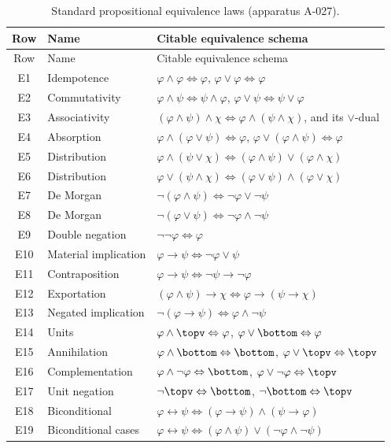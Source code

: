 \begingroup\small
\begin{longtable}{@{}clp{}@{}}
\caption{Standard propositional equivalence laws (apparatus A-027).}
\label{tab:p02-equivalence-laws}\\
\toprule Row & Name & Citable equivalence schema \\
\midrule\endfirsthead
\toprule Row & Name & Citable equivalence schema \\
\midrule\endhead
E1 & Idempotence & \(\varphi\land\varphi\Leftrightarrow\varphi\),
 \(\varphi\lor\varphi\Leftrightarrow\varphi\) \\
E2 & Commutativity & \(\varphi\land\psi\Leftrightarrow\psi\land\varphi\),
 \(\varphi\lor\psi\Leftrightarrow\psi\lor\varphi\) \\
E3 & Associativity & \((\varphi\land\psi)\land\chi\Leftrightarrow
 \varphi\land(\psi\land\chi)\), and its \(\lor\)-dual \\
E4 & Absorption & \(\varphi\land(\varphi\lor\psi)\Leftrightarrow\varphi\),
 \(\varphi\lor(\varphi\land\psi)\Leftrightarrow\varphi\) \\
E5 & Distribution & \(\varphi\land(\psi\lor\chi)\Leftrightarrow
 (\varphi\land\psi)\lor(\varphi\land\chi)\) \\
E6 & Distribution & \(\varphi\lor(\psi\land\chi)\Leftrightarrow
 (\varphi\lor\psi)\land(\varphi\lor\chi)\) \\
E7 & De Morgan & \(\neg(\varphi\land\psi)\Leftrightarrow
 \neg\varphi\lor\neg\psi\) \\
E8 & De Morgan & \(\neg(\varphi\lor\psi)\Leftrightarrow
 \neg\varphi\land\neg\psi\) \\
E9 & Double negation & \(\neg\neg\varphi\Leftrightarrow\varphi\) \\
E10 & Material implication & \(\varphi\to\psi\Leftrightarrow
 \neg\varphi\lor\psi\) \\
E11 & Contraposition & \(\varphi\to\psi\Leftrightarrow
 \neg\psi\to\neg\varphi\) \\
E12 & Exportation & \((\varphi\land\psi)\to\chi\Leftrightarrow
 \varphi\to(\psi\to\chi)\) \\
E13 & Negated implication & \(\neg(\varphi\to\psi)\Leftrightarrow
 \varphi\land\neg\psi\) \\
E14 & Units & \(\varphi\land\topv\Leftrightarrow\varphi\),
 \(\varphi\lor\bottom\Leftrightarrow\varphi\) \\
E15 & Annihilation & \(\varphi\land\bottom\Leftrightarrow\bottom\),
 \(\varphi\lor\topv\Leftrightarrow\topv\) \\
E16 & Complementation & \(\varphi\land\neg\varphi\Leftrightarrow\bottom\),
 \(\varphi\lor\neg\varphi\Leftrightarrow\topv\) \\
E17 & Unit negation & \(\neg\topv\Leftrightarrow\bottom\),
 \(\neg\bottom\Leftrightarrow\topv\) \\
E18 & Biconditional & \(\varphi\leftrightarrow\psi\Leftrightarrow
 (\varphi\to\psi)\land(\psi\to\varphi)\) \\
E19 & Biconditional cases & \(\varphi\leftrightarrow\psi\Leftrightarrow
 (\varphi\land\psi)\lor(\neg\varphi\land\neg\psi)\) \\
\bottomrule
\end{longtable}
\endgroup

